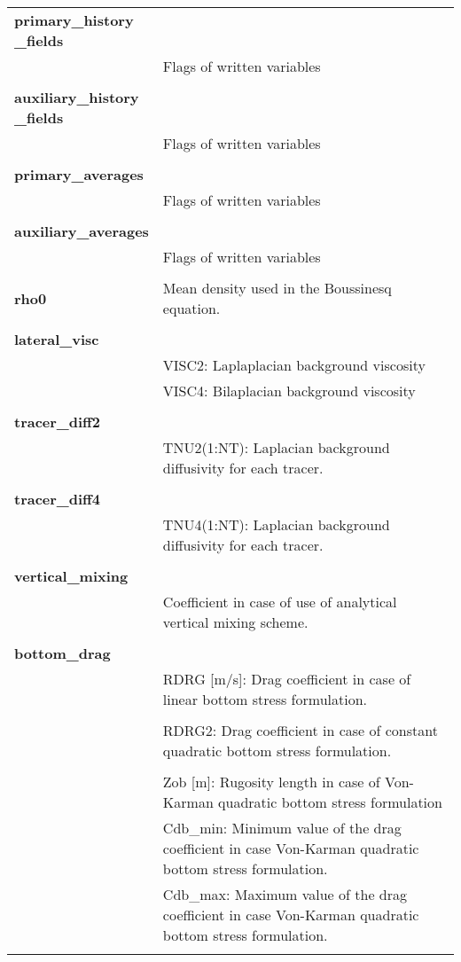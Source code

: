 \begin{longtable}{|p{0.25\linewidth}|p{0.75\linewidth}|}
\large{\textbf{primary\_history \_fields}} &     \\ 
&   Flags of written variables \\ 
&  \\ 

\large{\textbf{auxiliary\_history \_fields}} &     \\ 
&  Flags of written variables \\ 
&  \\ 

\large{\textbf{primary\_averages}} &     \\ 
&  Flags of written variables \\ 
&  \\ 

\large{\textbf{auxiliary\_averages}} &     \\ 
&  Flags of written variables \\ 
&  \\ 

\large{\textbf{rho0}} & Mean density used in the Boussinesq equation. \\ 
&  \\  

\large{\textbf{lateral\_visc}} &     \\ 
&  VISC2: Laplaplacian background viscosity \\
&  VISC4: Bilaplacian  background viscosity \\
&  \\ 

\large{\textbf{tracer\_diff2}} &     \\ 
& TNU2(1:NT): Laplacian background diffusivity for  each tracer.  \\
&  \\ 

\large{\textbf{tracer\_diff4}} &     \\ 
& TNU4(1:NT): Laplacian background diffusivity for  each tracer.  \\
&  \\ 

\large{\textbf{vertical\_mixing}} &     \\ 
& Coefficient in case of use of analytical vertical mixing scheme.  \\ 
&  \\ 

\large{\textbf{bottom\_drag}} &     \\ 
& RDRG [m/s]: Drag coefficient in case of linear bottom stress formulation. \\
& \\
& RDRG2: Drag coefficient in case of constant quadratic bottom stress formulation. \\
& \\
& Zob [m]: Rugosity length in case of Von-Karman quadratic bottom stress formulation \\
& Cdb\_min: Minimum value of the drag coefficient in case Von-Karman quadratic bottom stress formulation. \\
& Cdb\_max: Maximum value of the drag coefficient in case Von-Karman quadratic bottom stress formulation. \\
&  \\ 


\end{longtable}
